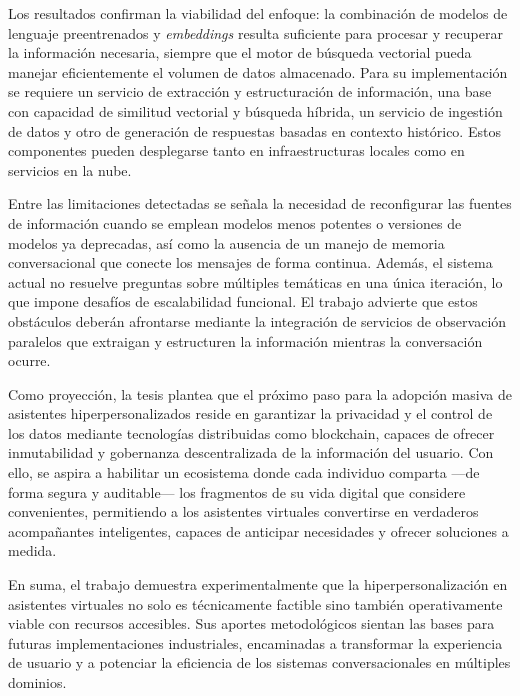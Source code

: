 Los resultados confirman la viabilidad del enfoque: la combinación de modelos de lenguaje preentrenados y \textit{embeddings} resulta suficiente para procesar y recuperar la información necesaria, siempre que el motor de búsqueda vectorial pueda manejar eficientemente el volumen de datos almacenado. Para su implementación se requiere un servicio de extracción y estructuración de información, una base con capacidad de similitud vectorial y búsqueda híbrida, un servicio de ingestión de datos y otro de generación de respuestas basadas en contexto histórico. Estos componentes pueden desplegarse tanto en infraestructuras locales como en servicios en la nube.

Entre las limitaciones detectadas se señala la necesidad de reconfigurar las fuentes de información cuando se emplean modelos menos potentes o versiones de modelos ya deprecadas, así como la ausencia de un manejo de memoria conversacional que conecte los mensajes de forma continua. Además, el sistema actual no resuelve preguntas sobre múltiples temáticas en una única iteración, lo que impone desafíos de escalabilidad funcional. El trabajo advierte que estos obstáculos deberán afrontarse mediante la integración de servicios de observación paralelos que extraigan y estructuren la información mientras la conversación ocurre.

Como proyección, la tesis plantea que el próximo paso para la adopción masiva de asistentes hiperpersonalizados reside en garantizar la privacidad y el control de los datos mediante tecnologías distribuidas como blockchain, capaces de ofrecer inmutabilidad y gobernanza descentralizada de la información del usuario. Con ello, se aspira a habilitar un ecosistema donde cada individuo comparta —de forma segura y auditable— los fragmentos de su vida digital que considere convenientes, permitiendo a los asistentes virtuales convertirse en verdaderos acompañantes inteligentes, capaces de anticipar necesidades y ofrecer soluciones a medida.

En suma, el trabajo demuestra experimentalmente que la hiperpersonalización en asistentes virtuales no solo es técnicamente factible sino también operativamente viable con recursos accesibles. Sus aportes metodológicos sientan las bases para futuras implementaciones industriales, encaminadas a transformar la experiencia de usuario y a potenciar la eficiencia de los sistemas conversacionales en múltiples dominios.
